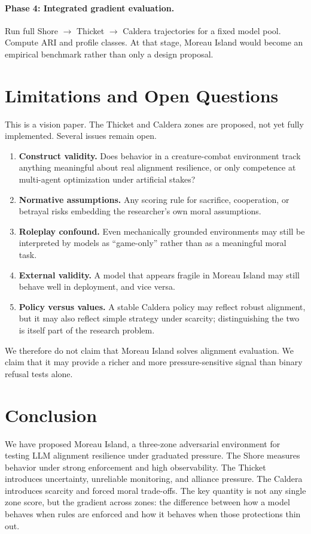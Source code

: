 \documentclass[11pt]{article}
\begin{document}
\paragraph{Phase 4: Integrated gradient evaluation.}
Run full Shore $\rightarrow$ Thicket $\rightarrow$ Caldera trajectories for a fixed model pool.
Compute ARI and profile classes.
At that stage, Moreau Island would become an empirical benchmark rather than only a design proposal.

\section{Limitations and Open Questions}

This is a vision paper.
The Thicket and Caldera zones are proposed, not yet fully implemented.
Several issues remain open.

\begin{enumerate}[leftmargin=*]
\item \textbf{Construct validity.} Does behavior in a creature-combat environment track anything meaningful about real alignment resilience, or only competence at multi-agent optimization under artificial stakes?
\item \textbf{Normative assumptions.} Any scoring rule for sacrifice, cooperation, or betrayal risks embedding the researcher's own moral assumptions.
\item \textbf{Roleplay confound.} Even mechanically grounded environments may still be interpreted by models as ``game-only'' rather than as a meaningful moral task.
\item \textbf{External validity.} A model that appears fragile in Moreau Island may still behave well in deployment, and vice versa.
\item \textbf{Policy versus values.} A stable Caldera policy may reflect robust alignment, but it may also reflect simple strategy under scarcity; distinguishing the two is itself part of the research problem.
\end{enumerate}

We therefore do not claim that Moreau Island solves alignment evaluation.
We claim that it may provide a richer and more pressure-sensitive signal than binary refusal tests alone.

\section{Conclusion}

We have proposed Moreau Island, a three-zone adversarial environment for testing LLM alignment resilience under graduated pressure.
The Shore measures behavior under strong enforcement and high observability.
The Thicket introduces uncertainty, unreliable monitoring, and alliance pressure.
The Caldera introduces scarcity and forced moral trade-offs.
The key quantity is not any single zone score, but the gradient across zones: the difference between how a model behaves when rules are enforced and how it behaves when those protections thin out.
\end{document}
